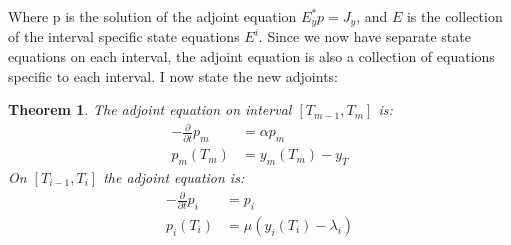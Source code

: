 \documentclass[11pt,a4paper]{article}
\newtheorem{theorem}{Theorem}
\begin{document}
Where p is the solution of the adjoint equation $E_y^*p=J_y$, and $E$ is the collection of the interval specific state equations $E^i$. Since we now have separate state equations on each interval, the adjoint equation is also a collection of equations specific to each interval. I now state the new adjoints:
\begin{theorem}
The adjoint equation on interval $[T_{m-1},T_m]$ is:
\begin{align*}
-\frac{\partial }{\partial t}p_m &=\alpha p_m  \\
p_m(T_{m}) &= y_m(T_{m})-y_T
\end{align*}
On $[T_{i-1},T_i]$ the adjoint equation is:
\begin{align*}
-\frac{\partial }{\partial t}p_i &=p_i  \\
p_i(T_{i}) &= \mu(y_{i}(T_{i})-\lambda_{i} )
\end{align*}
\end{theorem} 
\end{document}
